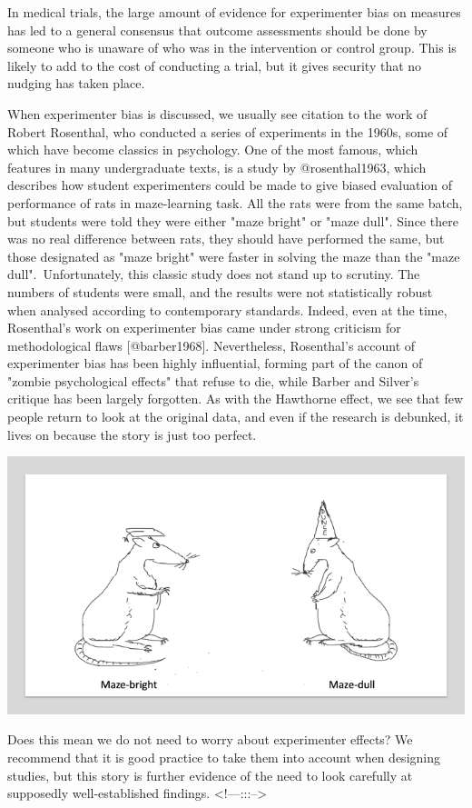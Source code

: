 \documentclass{krantz}
\begin{document}
In medical trials, the large amount of evidence for experimenter bias on measures has led to a general consensus that outcome assessments should be done by someone who is unaware of who was in the intervention or control group. This is likely to add to the cost of conducting a trial, but it gives security that no nudging has taken place.

\begin{tcolorbox}[colback=Black!5!lightgray,colframe=black!75!black,coltitle=white,title=Another questionable classic study]\label{box:Rosenthal}
When experimenter bias is discussed, we usually see citation to the work of Robert Rosenthal, who conducted a series of experiments in the 1960s, some of which have become classics in psychology. One of the most famous, which features in many undergraduate texts, is a study by @rosenthal1963, which describes how student experimenters could be made to give biased evaluation of performance of rats in maze-learning task. All the rats were from the same batch, but students were told they were either "maze bright" or "maze dull". Since there was no real difference between rats, they should have performed the same, but those designated as "maze bright" were faster in solving the maze than the "maze dull".\
Unfortunately, this classic study does not stand up to scrutiny. The numbers of students were small, and the results were not statistically robust when analysed according to contemporary standards. Indeed, even at the time, Rosenthal's work on experimenter bias came under strong criticism for methodological flaws [@barber1968]. Nevertheless, Rosenthal's account of experimenter bias has been highly influential, forming part of the canon of "zombie psychological effects" that refuse to die, while Barber and Silver's critique has been largely forgotten. As with the Hawthorne effect, we see that few people return to look at the original data, and even if the research is debunked, it lives on because the story is just too perfect.

\begin{center}

\includegraphics[width=0.4\linewidth]{images_bw/ratsx2} 
\end{center}
Does this mean we do not need to worry about experimenter effects? We recommend that it is good practice to take them into account when designing studies, but this story is further evidence of the need to look carefully at supposedly well-established findings.
<!---:::-->
\end{tcolorbox}
\end{document}
